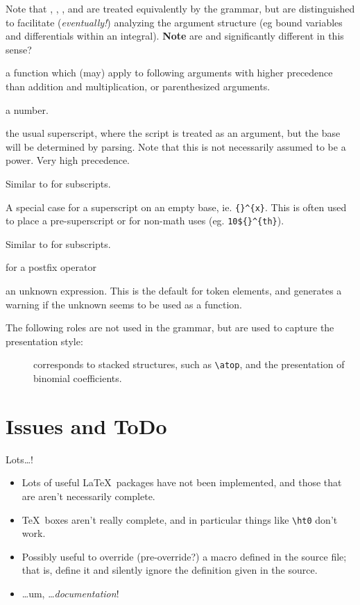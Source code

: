 \documentclass{article}
\begin{document}
\begin{description}
 Note that , , ,  and  are treated
 equivalently by the grammar, but are distinguished to facilitate (\emph{eventually!}) 
 analyzing the argument structure (eg bound variables and differentials within an integral).
 \textbf{Note} are  and  significantly different in this sense?
\item[\code{VERTBAR}]
\item[\code{FUNCTION}] a function which (may) apply to following arguments with higher
   precedence than addition and multiplication, or parenthesized arguments.
\item[\code{NUMBER}] a number.
\item[\code{POSTSUPERSCRIPT}] the usual superscript, where the script is treated as
  an argument, but the base will be determined by parsing. Note that this is not
  necessarily assumed to be a power. Very high precedence.
\item[\code{POSTSUBSCRIPT}] Similar to  for subscripts.
\item[\code{FLOATINGSUPERSCRIPT}] A special case for a superscript on an empty base,
  ie. \verb|{}^{x}|.  This is often used to place a pre-superscript or for
  non-math uses (eg. \verb|10${}^{th}|).
\item[\code{FLOATINGSUBSCRIPT}] Similar to  for subscripts.
\item[\code{POSTFIX}] for a postfix operator
\item[\code{UNKNOWN}] an unknown expression. This is the default for token elements,
  and generates a warning if the unknown seems to be used as a function.
\end{description}

The following roles are not used in the grammar, but are used to capture
the presentation style:
\begin{description}
\item[] corresponds to stacked structures, such as
  \verb|\atop|, and the presentation of binomial coefficients.
\end{description}

\section{Issues and ToDo}\label{app:todo}
Lots\ldots!
\begin{itemize}
\item Lots of useful \LaTeX\ packages have not been implemented, and those
  that are aren't necessarily complete.
\item \TeX\ boxes aren't really complete, and in particular things like \verb|\ht0|
  don't work.
\item Possibly useful to override (pre-override?) a macro defined in the source file;
  that is, define it and silently ignore the definition given in the source.
\item \ldots um, \ldots \emph{documentation}!
\end{itemize}
\end{document}
